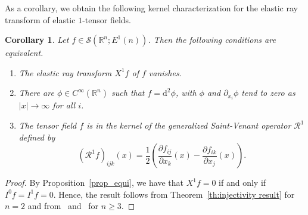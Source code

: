 \documentclass[11pt]{article}
\newcommand{\abs}[1]{\lvert #1 \rvert}
\newcommand{\Rc}{\mathcal{R}}
\newcommand{\sch}{\mathcal{S}}
\renewcommand{\d}{\mathrm{d}}
\newtheorem{corollary}[theorem]{Corollary}
\begin{document}
\noindent As a corollary, we obtain the following kernel characterization for the elastic ray transform of elastic $1$-tensor fields.
\begin{corollary}
Let $f\in \sch(\mathbb{R}^n;E^1(n))$. Then the following conditions are equivalent.
\begin{enumerate}
\item The elastic ray transform $X^1f$ of $f$ vanishes.

\item There are $\phi \in C^\infty(\mathbb{R}^n)$ such that $f= \d^2 \phi$,  with $\phi$ and $\partial_{x_i}\phi$ tend to zero as $\abs{x} \to \infty$ for all $i$.

\item The tensor field $f$ is in the kernel of the generalized Saint-Venant operator $\mathcal{R}^1$ defined by
\begin{equation}
(\mathcal{R}^1f)_{ijk}(x)
=
\frac{1}{2}
\left(
\frac{\partial f_{ij}}{\partial x_k}(x)
-
\frac{\partial f_{ik}}{\partial x_j}(x)
\right).
\end{equation}
\end{enumerate}
\end{corollary}
\begin{proof}
By Proposition~\ref{prop_equi}, we have that $X^1f=0$ if and only if $I^0f=I^1f=0$. Hence, the result follows from Theorem~\ref{th:injectivity result} for $n = 2$ and from~\cite[Theorem 3.1]{MS2023} and~\cite[Theorem 4.3]{Rohit_Suman} for $n \geq 3$.
\end{proof}
\appendix
\end{document}
